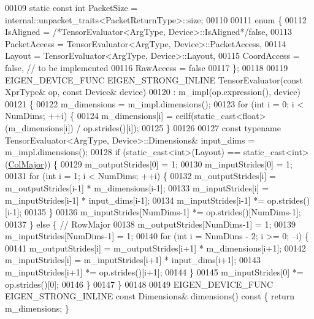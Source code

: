 \begin{DoxyCode}
00109   \textcolor{keyword}{static} \textcolor{keyword}{const} \textcolor{keywordtype}{int} PacketSize = internal::unpacket\_traits<PacketReturnType>::size;
00110 
00111   \textcolor{keyword}{enum} \{
00112     IsAligned = \textcolor{comment}{/*TensorEvaluator<ArgType, Device>::IsAligned*/}\textcolor{keyword}{false},
00113     PacketAccess = TensorEvaluator<ArgType, Device>::PacketAccess,
00114     Layout = TensorEvaluator<ArgType, Device>::Layout,
00115     CoordAccess = \textcolor{keyword}{false},  \textcolor{comment}{// to be implemented}
00116     RawAccess = \textcolor{keyword}{false}
00117   \};
00118 
00119   EIGEN\_DEVICE\_FUNC EIGEN\_STRONG\_INLINE TensorEvaluator(\textcolor{keyword}{const} XprType& op, \textcolor{keyword}{const} Device& device)
00120       : m\_impl(op.expression(), device)
00121   \{
00122     m\_dimensions = m\_impl.dimensions();
00123     \textcolor{keywordflow}{for} (\textcolor{keywordtype}{int} i = 0; i < NumDims; ++i) \{
00124       m\_dimensions[i] = ceilf(static\_cast<float>(m\_dimensions[i]) / op.strides()[i]);
00125     \}
00126 
00127     \textcolor{keyword}{const} \textcolor{keyword}{typename} TensorEvaluator<ArgType, Device>::Dimensions& input\_dims = m\_impl.dimensions();
00128     \textcolor{keywordflow}{if} (static\_cast<int>(Layout) == static\_cast<int>(\hyperlink{group__enums_ggaacded1a18ae58b0f554751f6cdf9eb13a0cbd4bdd0abcfc0224c5fcb5e4f6669a}{ColMajor})) \{
00129       m\_outputStrides[0] = 1;
00130       m\_inputStrides[0] = 1;
00131       \textcolor{keywordflow}{for} (\textcolor{keywordtype}{int} i = 1; i < NumDims; ++i) \{
00132         m\_outputStrides[i] = m\_outputStrides[i-1] * m\_dimensions[i-1];
00133         m\_inputStrides[i] = m\_inputStrides[i-1] * input\_dims[i-1];
00134         m\_inputStrides[i-1] *= op.strides()[i-1];
00135       \}
00136       m\_inputStrides[NumDims-1] *= op.strides()[NumDims-1];
00137     \} \textcolor{keywordflow}{else} \{  \textcolor{comment}{// RowMajor}
00138       m\_outputStrides[NumDims-1] = 1;
00139       m\_inputStrides[NumDims-1] = 1;
00140       \textcolor{keywordflow}{for} (\textcolor{keywordtype}{int} i = NumDims - 2; i >= 0; --i) \{
00141         m\_outputStrides[i] = m\_outputStrides[i+1] * m\_dimensions[i+1];
00142         m\_inputStrides[i] = m\_inputStrides[i+1] * input\_dims[i+1];
00143         m\_inputStrides[i+1] *= op.strides()[i+1];
00144       \}
00145       m\_inputStrides[0] *= op.strides()[0];
00146     \}
00147   \}
00148 
00149   EIGEN\_DEVICE\_FUNC EIGEN\_STRONG\_INLINE \textcolor{keyword}{const} Dimensions& dimensions()\textcolor{keyword}{ const }\{ \textcolor{keywordflow}{return} m\_dimensions; \}

\end{DoxyCode}
